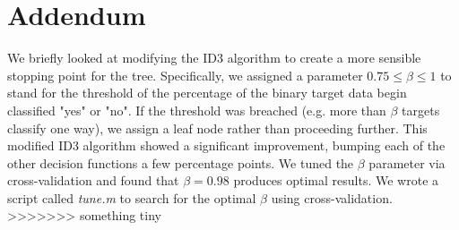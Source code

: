 \documentclass[a4paper,12pt,oneside,final]{report}
\begin{document}
\chapter{Addendum}
We briefly looked at modifying the ID3 algorithm to create a more sensible stopping point for the tree.  Specifically, we assigned a parameter $0.75 \leq \beta\leq 1$ to stand for the threshold of the percentage of the binary target data begin classified "yes" or "no".  If the threshold was breached (e.g. more than $\beta$ targets classify one way), we assign a leaf node rather than proceeding further.  This modified ID3 algorithm showed a significant improvement, bumping each of the other decision functions a few percentage points.  We tuned the $\beta$ parameter via cross-validation and found that $\beta = 0.98$ produces optimal results.  We wrote a script called \emph{tune.m} to search for the optimal $\beta$ using cross-validation.
>>>>>>> something tiny
\end{document}
